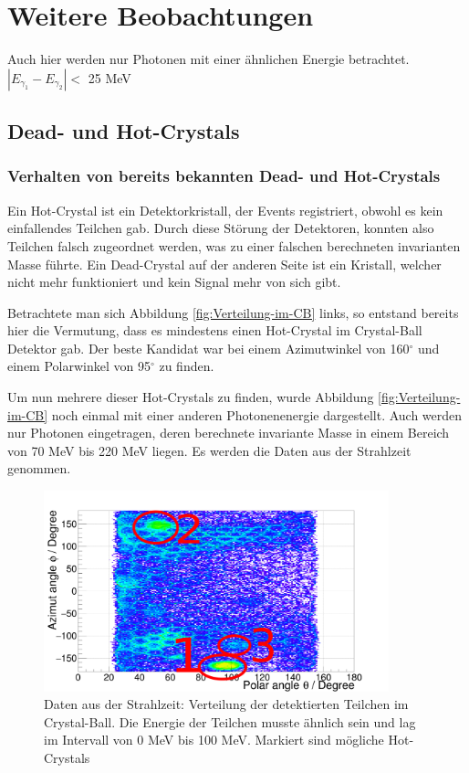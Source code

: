 \documentclass[a4paper,11pt,oneside,final,german,openbib,pdftex]{scrbook}
\begin{document}
{\chapter{Weitere Beobachtungen}
\label{sec:Weitere-Beobachtungen}
Auch hier werden nur Photonen mit einer \"ahnlichen Energie betrachtet. $|E_{\gamma_1}-E_{\gamma_2}|<$ 25 MeV
\section{Dead- und Hot-Crystals}
\subsection{Verhalten von bereits bekannten Dead- und Hot-Crystals}
\label{sec:Bekannte-Dead-Crystals}
Ein Hot-Crystal ist ein Detektorkristall, der Events registriert, obwohl es kein einfallendes Teilchen gab. Durch diese St\"orung der Detektoren, konnten also Teilchen falsch zugeordnet werden, was zu einer falschen berechneten invarianten Masse f\"uhrte. 
Ein Dead-Crystal auf der anderen Seite ist ein Kristall, welcher nicht mehr funktioniert und kein Signal mehr von sich gibt.

Betrachtete man sich Abbildung \ref{fig:Verteilung-im-CB} links, so entstand bereits hier die Vermutung, dass es mindestens einen Hot-Crystal im Crystal-Ball Detektor gab. Der beste Kandidat war bei einem Azimutwinkel von 160$^{\circ}$ und einem Polarwinkel von 95$^{\circ}$ zu finden.

Um nun mehrere dieser Hot-Crystals zu finden, wurde Abbildung \ref{fig:Verteilung-im-CB} noch einmal mit einer anderen Photonenenergie dargestellt. Auch werden nur Photonen eingetragen, deren berechnete invariante Masse in einem Bereich von 70 MeV bis 220 MeV liegen. Es werden die Daten aus der Strahlzeit genommen.

\begin{figure}[h!]
	\begin{center}
		\includegraphics[width=100mm]{NewCalib/Strahlzeit2014/ClusterSize/20172104StrahlzeitClusterSize0Marker}
	\end{center}
	\caption[Strahlzeit: Markierte '\textit{Hot-Crystals}'; Niedrige Energien]{Daten aus der Strahlzeit: Verteilung der detektierten Teilchen im Crystal-Ball. Die Energie der Teilchen musste \"ahnlich sein und lag im Intervall von 0 MeV bis 100 MeV. Markiert sind m\"ogliche Hot-Crystals}
	\label{fig:Markierte-Hot-Crystals}
\end{figure}

}
\end{document}
